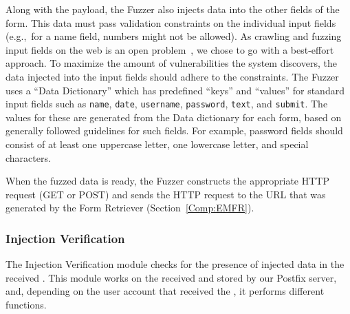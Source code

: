 
Along with the payload, the Fuzzer also injects data into the other fields of the form. This data must pass validation constraints on the individual input fields (e.g.,\ for a name field, numbers might not be allowed).  As crawling and fuzzing input fields on the web is an open problem~\cite{raghavan2000crawling}, we chose to go with a best-effort approach. To maximize the amount of vulnerabilities the system discovers, the data injected into the input fields should adhere to the constraints. The Fuzzer uses a ``Data Dictionary'' which has predefined ``keys'' and ``values'' for standard input fields such as \texttt{name}, \texttt{date}, \texttt{username}, \texttt{password}, \texttt{text}, and \texttt{submit}.
The values for these are generated from the Data dictionary for each form, based on generally followed guidelines for such fields. For example, password fields should consist of at least one uppercase letter, one lowercase letter, and special characters.

When the fuzzed data is ready, the Fuzzer constructs the appropriate HTTP request (GET or POST) and sends the HTTP request to the URL that was generated by the \Email Form Retriever (Section~\ref{Comp:EMFR}). 


\subsubsection{Injection Verification}
\label{Comp:EMA}
The Injection Verification module checks for the presence of injected data in the received \emails. This module works on the \emails received and stored by our Postfix server, and, depending on the user account that received the \email, it performs different functions.

